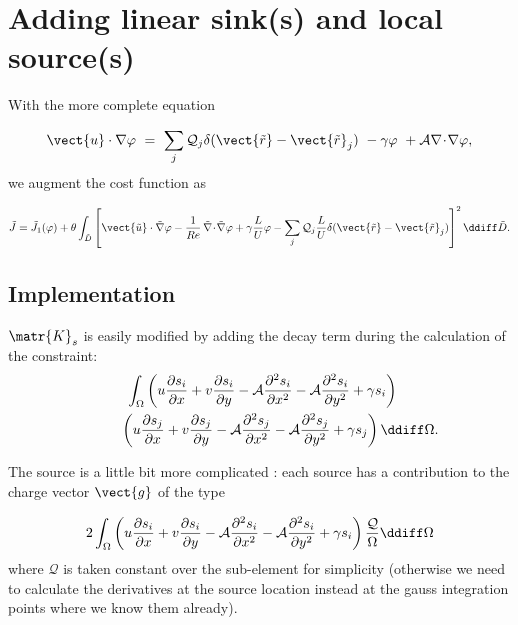 \section{Adding linear sink(s) and local source(s)}
With the more complete equation

\begin{equation}
\vect{u} \cdot {\nabla} \varphi
~=~ \sum_j \mathcal{Q}_j\delta( \vect{\tilde{r}}-\vect{\tilde{r}}_j ) ~-\gamma \varphi ~+ \mathcal{A}  {\nabla}\! \cdot\! {\nabla}\varphi ,
\end{equation}
we augment the cost function as

\begin{equation}
\tilde{J}= \tilde{J}_1(\varphi) + {\theta  } \int_{\tilde{D}}\left[ 
\vect{\tilde{u}} \cdot \tilde{\nabla} \varphi
- {1  \over Re} \, \tilde{\nabla}\! \cdot\! \tilde{\nabla}\varphi
 +  \gamma {L \over U}  \varphi   - \sum_j \mathcal{Q}_j {L \over U} \delta( \vect{\tilde{r}}-\vect{\tilde{r}}_j ) \right]^2 \ddiff \tilde{D}.
\end{equation}

\subsection{Implementation}

$\matr{K}_s$ is easily modified by adding the decay term during the calculation of the constraint:
\begin{eqnarray}
\int_\Omega \left( u {\partial s_i \over \partial x}+v {\partial s_i \over \partial y}-\mathcal{A} {\partial^2 s_i \over \partial x^2} -\mathcal{A} {\partial^2 s_i \over \partial y^2}+ \gamma s_i \right) \quad \quad \quad \notag \\
\quad \quad \quad \left( u {\partial s_j \over \partial x}+v {\partial s_j \over \partial y}-\mathcal{A} {\partial^2 s_j \over \partial x^2} -\mathcal{A} {\partial^2 s_j \over \partial y^2}
+\gamma s_j
\right)\ddiff \Omega. \notag 
\end{eqnarray}

The source is a little bit more complicated :
each source has a contribution to the charge vector $\vect{g}$ of the type

\begin{equation}
2 \int_\Omega \left( u {\partial s_i \over \partial x}+v {\partial s_i \over \partial y}-\mathcal{A} {\partial^2 s_i \over \partial x^2} -\mathcal{A} {\partial^2 s_i \over \partial y^2}+ \gamma s_i \right) {\mathcal{Q} \over \Omega} \ddiff \Omega
\end{equation}
where $\mathcal{Q}$ is taken constant over the sub-element for simplicity (otherwise we need to calculate the derivatives at the source location instead at the gauss integration points where we know them already).


